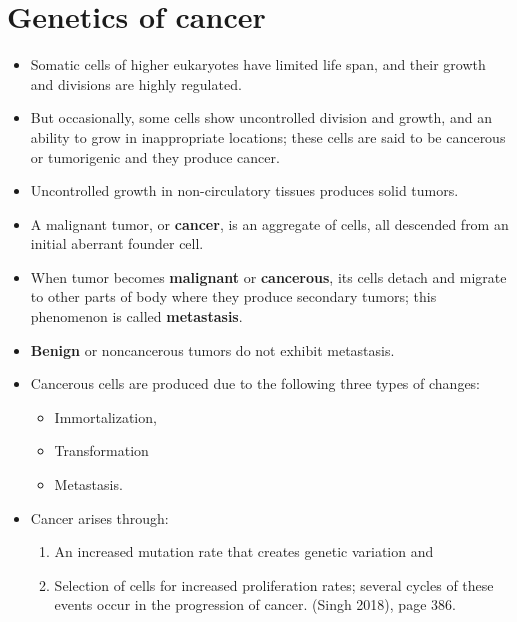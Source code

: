 \documentclass[11pt,dvipsnames,ignorenonframetext,aspectratio=169]{beamer}
\providecommand{\tightlist}{%
  \setlength{\itemsep}{0pt}\setlength{\parskip}{0pt}}
\begin{document}
\hypertarget{genetics-of-cancer}{%
\section{Genetics of cancer}\label{genetics-of-cancer}}

\begin{frame}{}
\protect\hypertarget{section-9}{}

\begin{itemize}
\tightlist
\item
  Somatic cells of higher eukaryotes have limited life span, and their
  growth and divisions are highly regulated.
\item
  But occasionally, some cells show uncontrolled division and growth,
  and an ability to grow in inappropriate locations; these cells are
  said to be cancerous or tumorigenic and they produce cancer.
\item
  Uncontrolled growth in non-circulatory tissues produces solid tumors.
\item
  A malignant tumor, or \textbf{cancer}, is an aggregate of cells, all
  descended from an initial aberrant founder cell.
\item
  When tumor becomes \textbf{malignant} or \textbf{cancerous}, its cells
  detach and migrate to other parts of body where they produce secondary
  tumors; this phenomenon is called \textbf{metastasis}.
\item
  \textbf{Benign} or noncancerous tumors do not exhibit metastasis.
\end{itemize}

\end{frame}

\begin{frame}{}
\protect\hypertarget{section-10}{}

\begin{itemize}
\tightlist
\item
  Cancerous cells are produced due to the following three types of
  changes:

  \begin{itemize}
  \tightlist
  \item
    Immortalization,
  \item
    Transformation
  \item
    Metastasis.
  \end{itemize}
\item
  Cancer arises through:

  \begin{enumerate}
  \tightlist
  \item
    An increased mutation rate that creates genetic variation and
  \item
    Selection of cells for increased proliferation rates; several cycles
    of these events occur in the progression of cancer. (Singh 2018),
    page 386.
  \end{enumerate}
\end{itemize}

\end{frame}
\end{document}
